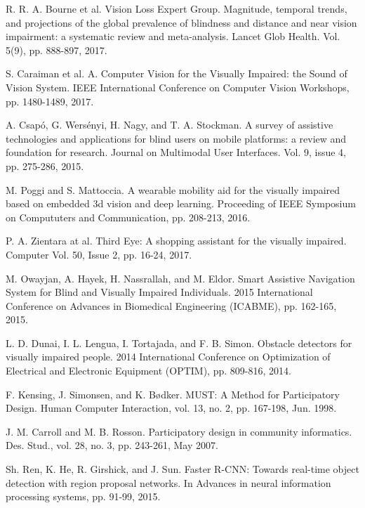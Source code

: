 \documentclass[10pt,conference,compsocconf]{IEEEtran}
\begin{document}
\begin{thebibliography}{99}

 R. R. A. Bourne et al. Vision Loss Expert Group. Magnitude, temporal trends, and projections of the global prevalence of blindness and distance and near vision impairment: a systematic review and meta-analysis. Lancet Glob Health. Vol. 5(9), pp. 888-897, 2017.


 S. Caraiman et al. A. Computer Vision for the Visually Impaired: the Sound of Vision System. IEEE International Conference on Computer Vision Workshops, pp. 1480-1489, 2017.

 A. Csap\'{o}, G. Wers\'{e}nyi, H. Nagy, and T. A. Stockman. A survey of assistive technologies and applications for blind users on mobile platforms: a review and foundation for research. Journal on Multimodal User Interfaces. Vol. 9, issue 4,  pp. 275-286, 2015.


 M. Poggi and S. Mattoccia. A wearable mobility aid for the visually impaired based on embedded 3d vision and deep learning. Proceeding of IEEE Symposium on Compututers and Communication, pp. 208-213, 2016.

 P. A. Zientara at al. Third Eye: A shopping assistant for the visually impaired. Computer Vol. 50, Issue 2, pp. 16-24, 2017.


 M. Owayjan, A. Hayek, H. Nassrallah, and M. Eldor. Smart Assistive Navigation System for Blind and Visually Impaired Individuals. 2015 International Conference on Advances in Biomedical Engineering (ICABME), pp. 162-165, 2015.


 L. D. Dunai, I. L. Lengua, I. Tortajada, and F. B. Simon. Obstacle detectors for visually impaired people. 2014 International Conference on Optimization of Electrical and Electronic Equipment (OPTIM),  pp. 809-816, 2014.

 F. Kensing, J. Simonsen, and K. B\o dker. MUST: A Method for Participatory Design. Human Computer Interaction, vol. 13, no. 2, pp. 167-198, Jun. 1998.


 J. M. Carroll and M. B. Rosson. Participatory design in community informatics. Des. Stud., vol. 28, no. 3, pp. 243-261, May 2007.

 Sh. Ren, K. He, R. Girshick, and J. Sun.  Faster R-CNN: Towards real-time object detection with region proposal networks. In Advances in neural information processing systems, pp. 91-99, 2015.





\end{thebibliography}
\end{document}
